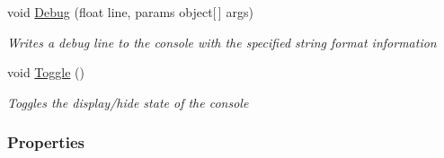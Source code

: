 \begin{DoxyCompactItemize}
void \hyperlink{class_m_b2_d_1_1_m_b_console_a918307d1a003684b1fa3e0d11243b1f9}{Debug} (float line, params object\mbox{[}$\,$\mbox{]} args)
\begin{DoxyCompactList}\small\item\em Writes a debug line to the console with the specified string format information \end{DoxyCompactList}\item 
void \hyperlink{class_m_b2_d_1_1_m_b_console_aab4c284a98afb148e35cf28e6d8ba0fc}{Toggle} ()
\begin{DoxyCompactList}\small\item\em Toggles the display/hide state of the console \end{DoxyCompactList}\end{DoxyCompactItemize}
\subsubsection*{Properties}
